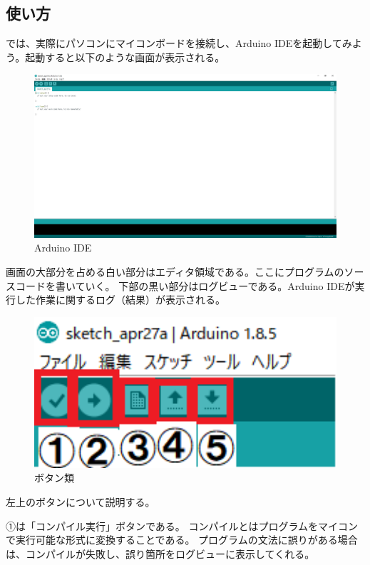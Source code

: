 \documentclass[uplatex]{jsarticle}
\begin{document}
\subsection{使い方}
では、実際にパソコンにマイコンボードを接続し、Arduino IDEを起動してみよう。起動すると以下のような画面が表示される。
\begin{figure}[htbp]
    \centering
    \includegraphics[width=15cm]{ide.png}
    \caption{Arduino IDE}
\end{figure}

画面の大部分を占める白い部分はエディタ領域である。ここにプログラムのソースコードを書いていく。
下部の黒い部分はログビューである。Arduino IDEが実行した作業に関するログ（結果）が表示される。

\begin{figure}[htbp]
    \centering
    \includegraphics[width=13cm]{ide_button.png}
    \caption{ボタン類}
\end{figure}

左上のボタンについて説明する。

①は「コンパイル実行」ボタンである。
コンパイルとはプログラムをマイコンで実行可能な形式に変換することである。
プログラムの文法に誤りがある場合は、コンパイルが失敗し、誤り箇所をログビューに表示してくれる。
\end{document}
